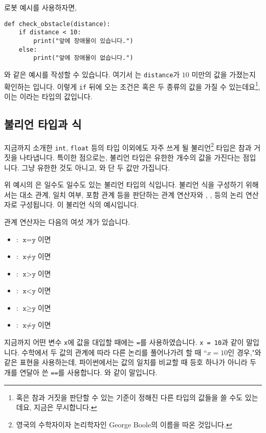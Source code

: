 \documentclass[../main.tex]{subfiles}
\begin{document}
로봇 예시를 사용하자면,
\begin{verbatim}
def check_obstacle(distance):
    if distance < 10:
        print("앞에 장애물이 있습니다.")
    else:
        print("앞에 장애물이 없습니다.")
\end{verbatim}
와 같은 예시를 작성할 수 있습니다.
여기서 는 \verb/distance/가 $10$ 미만의 값을 가졌는지 확인하는 입니다.
이렇게 \verb|if| 뒤에 오는 조건은  혹은  두 종류의 값을
가질 수 있는데요\footnote{혹은 참과 거짓을 판단할 수 있는 기준이 정해진 다른 타입의 값들을 쓸 수도 있는데요, 지금은 무시합니다.}, 이는 이라는 타입의 값입니다.

\subsection{불리언 타입과 식}
지금까지 소개한 \texttt{int}, \texttt{float} 등의 타입 이외에도 자주 쓰게 될 불리언\footnote{영국의 수학자이자 논리학자인 George Boole의 이름을 따온 것입니다.} 타입은 참과 거짓을
나타냅니다.
특이한 점으로는, 불리언 타입은 유한한 개수의 값을 가진다는 점입니다.
그냥 유한한 것도 아니고, 와  단 두 값만 가집니다.

위 예시의 은 일수도 일수도
있는 불리언 타입의 식입니다.  불리언 식을 구성하기 위해서는 대소 관계, 일치
여부, 포함 관계 등을 판단하는 관계 연산자와 , ,  등의
논리 연산자로 구성됩니다.
이 불리언 식의 예시입니다.

관계 연산자는 다음의 여섯 개가 있습니다.
\begin{itemize}
  \item {}: $\texttt{x} = \texttt{y}$이면 
  \item {}: $\texttt{x} \ne \texttt{y}$이면 
  \item {}:  $\texttt{x} > \texttt{y}$이면 
  \item {}:  $\texttt{x} < \texttt{y}$이면 
  \item {}: $\texttt{x} \ge \texttt{y}$이면 
  \item {}: $\texttt{x} \ne \texttt{y}$이면 
\end{itemize}
지금까지 어떤 변수 \texttt{x}에 값을 대입할 때에는 \texttt{=}를 사용하였습니다.
\texttt{x = 10}과 같이 말입니다.
수학에서 두 값의 관계에 따라 다른 논리를 풀어나가려 할 때 ``$x = 10$인 경우,"와 같은 표현을 사용하는데, 파이썬에서는 값의 일치를 비교할 때 등호 하나가 아니라 두 개를 연달아 쓴 \texttt{==}를 사용합니다.  와 같이 말입니다.
\end{document}
